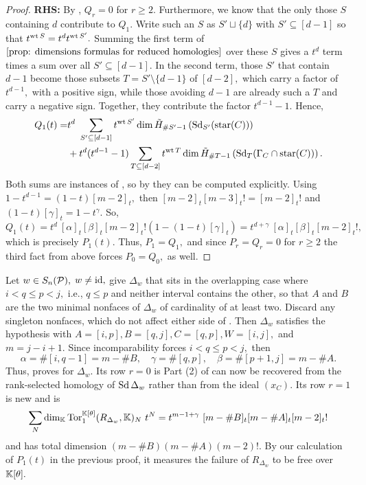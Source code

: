 \begin{proof}
    \textbf{RHS:} By , $Q_r = 0$ for $r\geq 2.$ Furthermore, we know that the only those $S$ containing $d$ contribute to $Q_1.$ Write such an $S$ as $S'\sqcup\{d\}$ with $S'\subseteq[d-1]$ so that $t^{\operatorname{wt} S} = t^dt^{\operatorname{wt} S'}.$
    Summing the first term of $\Cref{prop: dimensions formulas for reduced homologies}$ over these $S$ gives a $t^d$ term times a sum over all $S'\subseteq [d-1].$ In the second term, those $S'$ that contain $d-1$ become those subsets $T=S'\setminus\{d-1\}$ of $[d-2],$ which carry a factor of $t^{d-1},$ with a positive sign, while those avoiding $d-1$ are already such a $T$ and carry a negative sign. Together, they contribute the factor $t^{d-1}-1.$ Hence,
    \begin{align*}
        Q_1(t) = 
        & t^d~\sum_{S'\subseteq[d-1]}t^{\operatorname{wt} S'}
        \dim\Tilde{H}_{\#S'-1}\left(\operatorname{Sd}_{S'}(\mathrm{star}(C))\right) \\
        & + t^d(t^{d-1}-1)\sum_{T\subseteq [d-2]}t^{\operatorname{wt} T}
        \dim\Tilde{H}_{\#T-1}\left(\operatorname{Sd}_T(\Gamma_C\cap\mathrm{star}(C))\right).
    \end{align*}
    Both sums are instances of , so by  they can be computed explicitly. 
    Using $1 - t^{d-1} = (1-t)[m-2]_t,$ then $[m-2]_t[m-3]_t! = [m-2]_t!$ and $(1-t)[\gamma]_t = 1 - t^\gamma.$ So,
    \[
    Q_1(t) = t^d~[\alpha]_t[\beta]_t[m-2]_t!
    \left(1-(1-t)[\gamma]_t\right)
    = t^{d+\gamma}~[\alpha]_t[\beta]_t[m-2]_t!,
    \]
    which is precisely $P_1(t).$ 
    Thus, $P_1 = Q_1,$ and since $P_r = Q_r = 0$ for $r\geq 2$ the third fact from above forces $P_0 = Q_0,$ as well.
\end{proof}

\begin{remark}
\label{rmk: conj into Delta w notation}
Let $w\in S_n(\mathcal{P}),$ $w\neq\mathrm{id},$ give $\Delta_w$ that sits in the overlapping case where $i < q \leq p < j,$ i.e., $q\leq p$ and neither interval contains the other, so that $A$ and $B$ are the two minimal nonfaces of $\Delta_w$ of cardinality of at least two. 
Discard any singleton nonfaces, which do not affect either side of . 
Then $\Delta_w$ satisfies the hypothesis with $A = [i,p], B = [q,j], C = [q,p], W = [i,j],$ and $m = j - i + 1.$ 
Since incomparability forces $i < q\leq p < j,$ then
\[
\alpha = \#[i,q-1] = m - \#B,
\quad
\gamma = \#[q,p],
\quad
\beta = \#[p+1,j] = m - \#A.
\]
Thus,  proves  for $\Delta_w.$ Its row $r = 0$ is Part (2) of  can now be recovered from the rank-selected homology of $\operatorname{Sd}\Delta_w$ rather than from the ideal $(x_C).$ Its row $r=1$ is new and is
\[
\sum_N
\dim_{\mathbb{K}}\operatorname{Tor}_1^{\mathbb{K}[\theta]}(R_{\Delta_w},\mathbb{K})_N~t^N
=
t^{m-1+\gamma}~[m-\#B]_t[m-\#A]_t[m-2]_t!
\]
and has total dimension $(m-\#B)(m-\#A)(m-2)!.$ 
By our calculation of $P_1(t)$ in the previous proof, it measures the failure of $R_{\Delta_w}$ to be free over $\mathbb{K}[\theta].$
\end{remark}